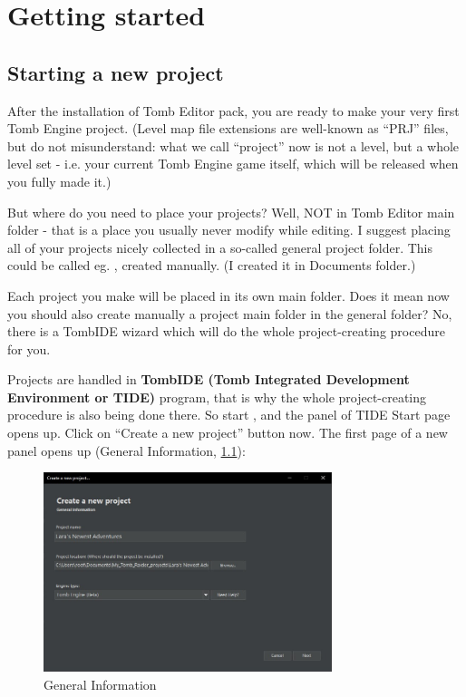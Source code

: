 \part{Getting started}

\chapter{Starting a new project}
After the installation of Tomb Editor pack, you are ready to make your very first Tomb Engine project. (Level map file extensions are well-known as “PRJ” files, but do not misunderstand: what we call “project” now is not a level, but a whole level set - i.e. your current Tomb Engine game itself, which will be released when you fully made it.)
\par But where do you need to place your projects? Well, NOT in Tomb Editor main folder - that is a place you usually never modify while editing. I suggest placing all of your projects nicely collected in a so-called general project folder. This could be called eg. , created manually. (I created it in Documents folder.)
\par Each project you make will be placed in its own main folder. Does it mean now you should also create manually a project main folder in the general folder? No, there is a TombIDE wizard which will do the whole project-creating procedure for you.
\par Projects are handled in \textbf{TombIDE (Tomb Integrated Development Environment or TIDE)} program, that is why the whole project-creating procedure is also being done there.
So start , and the panel of TIDE Start page opens up.
Click on “Create a new project” button now.
The first page of a new panel opens up (General Information, \ref{fig:tide1}):
\begin{figure}
    \centering
     \includegraphics[width=0.75\textwidth]{screenshots/1.jpg}
     \caption{General Information}
     \label{fig:tide1}
\end{figure}

